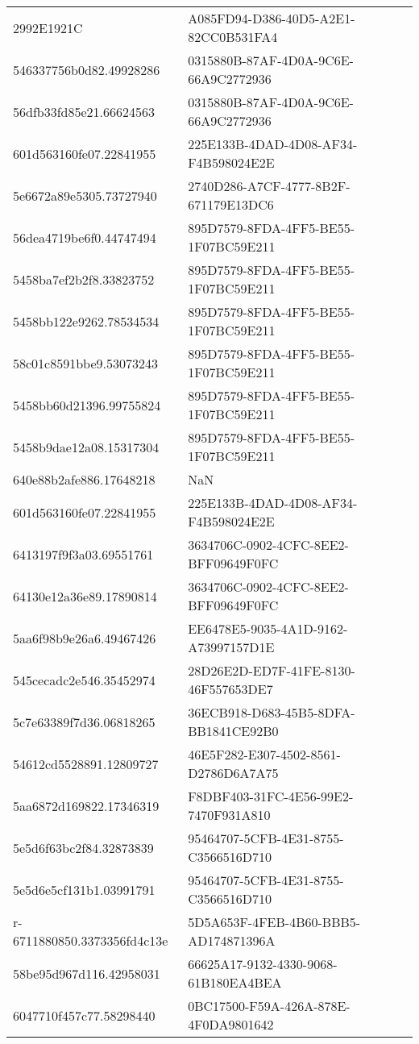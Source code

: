 \begin{tabular}{ll}
2992E1921C & A085FD94-D386-40D5-A2E1-82CC0B531FA4 \\
546337756b0d82.49928286 & 0315880B-87AF-4D0A-9C6E-66A9C2772936 \\
56dfb33fd85e21.66624563 & 0315880B-87AF-4D0A-9C6E-66A9C2772936 \\
601d563160fe07.22841955 & 225E133B-4DAD-4D08-AF34-F4B598024E2E \\
5e6672a89e5305.73727940 & 2740D286-A7CF-4777-8B2F-671179E13DC6 \\
56dea4719be6f0.44747494 & 895D7579-8FDA-4FF5-BE55-1F07BC59E211 \\
5458ba7ef2b2f8.33823752 & 895D7579-8FDA-4FF5-BE55-1F07BC59E211 \\
5458bb122e9262.78534534 & 895D7579-8FDA-4FF5-BE55-1F07BC59E211 \\
58c01c8591bbe9.53073243 & 895D7579-8FDA-4FF5-BE55-1F07BC59E211 \\
5458bb60d21396.99755824 & 895D7579-8FDA-4FF5-BE55-1F07BC59E211 \\
5458b9dae12a08.15317304 & 895D7579-8FDA-4FF5-BE55-1F07BC59E211 \\
640e88b2afe886.17648218 & NaN \\
601d563160fe07.22841955 & 225E133B-4DAD-4D08-AF34-F4B598024E2E \\
6413197f9f3a03.69551761 & 3634706C-0902-4CFC-8EE2-BFF09649F0FC \\
64130e12a36e89.17890814 & 3634706C-0902-4CFC-8EE2-BFF09649F0FC \\
5aa6f98b9e26a6.49467426 & EE6478E5-9035-4A1D-9162-A73997157D1E \\
545cecadc2e546.35452974 & 28D26E2D-ED7F-41FE-8130-46F557653DE7 \\
5c7e63389f7d36.06818265 & 36ECB918-D683-45B5-8DFA-BB1841CE92B0 \\
54612cd5528891.12809727 & 46E5F282-E307-4502-8561-D2786D6A7A75 \\
5aa6872d169822.17346319 & F8DBF403-31FC-4E56-99E2-7470F931A810 \\
5e5d6f63bc2f84.32873839 & 95464707-5CFB-4E31-8755-C3566516D710 \\
5e5d6e5cf131b1.03991791 & 95464707-5CFB-4E31-8755-C3566516D710 \\
r-6711880850.3373356fd4c13e & 5D5A653F-4FEB-4B60-BBB5-AD174871396A \\
58be95d967d116.42958031 & 66625A17-9132-4330-9068-61B180EA4BEA \\
6047710f457c77.58298440 & 0BC17500-F59A-426A-878E-4F0DA9801642 \\

\end{tabular}
